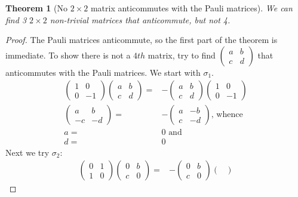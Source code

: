\documentclass[]{article}
\newtheorem{thm}{Theorem}
\begin{document}
\begin{thm}[No $2 \times 2$ matrix  anticommutes with the Pauli matrices]
	We can find 3 $2 \times 2$ non-trivial matrices that anticommute, but not 4.
\end{thm}
\begin{proof}
	The Pauli matrices anticommute, so the first part of the theorem is immediate. To show there is not a $4th$ matrix, try to find $\begin{pmatrix}
		a & b\\
		c & d
	\end{pmatrix}$ that anticommutes with the Pauli matrices. We start with $\sigma_1$.
	\begin{align*}
		\begin{pmatrix}
			1 & 0\\
			0 & -1
		\end{pmatrix}	\begin{pmatrix}
		a & b\\
		c & d
		\end{pmatrix} =& -	\begin{pmatrix}
		a & b\\
		c & d
		\end{pmatrix}	\begin{pmatrix}
		1 & 0\\
		0 & -1
		\end{pmatrix}\\
		\begin{pmatrix}
			a & b\\
			-c & -d
		\end{pmatrix} =& - \begin{pmatrix}
			a & -b\\
			c & -d
		\end{pmatrix} \text{, whence}\\
		a=&0 \text{ and} \\
		d=&0
	\end{align*}
	Next we try $\sigma_2$:
	\begin{align*}
		\begin{pmatrix}
			0 & 1\\
			1 & 0
		\end{pmatrix} \begin{pmatrix}
			0 & b\\
			c & 0
		\end{pmatrix} =& -\begin{pmatrix}
			0 & b\\
			c & 0
		\end{pmatrix} \begin{pmatrix}

\end{pmatrix}
\end{align*}
\end{proof}
\end{document}
